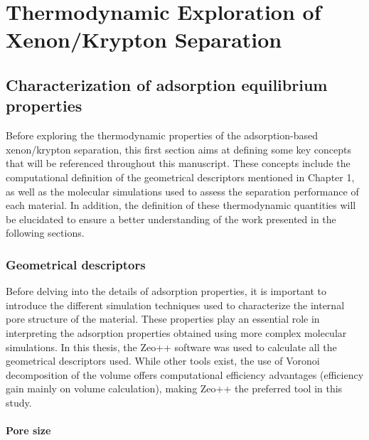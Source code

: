 \documentclass[main.tex]{subfiles}
\begin{document}
\chapter{Thermodynamic Exploration of Xenon/Krypton Separation}
\vspace*{-1\baselineskip}

\section{Characterization of adsorption equilibrium properties}

Before exploring the thermodynamic properties of the adsorption-based xenon/krypton separation, this first section aims at  defining some key concepts that will be referenced throughout this manuscript. These concepts include the computational definition of the geometrical descriptors mentioned in Chapter 1, as well as the molecular simulations used to assess the separation performance of each material. In addition, the definition of these thermodynamic quantities will be elucidated to ensure a better understanding of the work presented in the following sections.

\subsection{Geometrical descriptors}

Before delving into the details of adsorption properties, it is important to introduce the different simulation techniques used to characterize the internal pore structure of the material. These properties play an essential role in interpreting the adsorption properties obtained using more complex molecular simulations. In this thesis, the Zeo++ software was used to calculate all the geometrical descriptors used.\autocite{Zeo++} While other tools exist,\autocite{First_2013,PoreBlazer} the use of Voronoi decomposition of the volume offers computational efficiency advantages (efficiency gain mainly on volume calculation),\autocite{Rycroft_2009} making Zeo++ the preferred tool in this study.

\subsubsection{Pore size}
\end{document}
